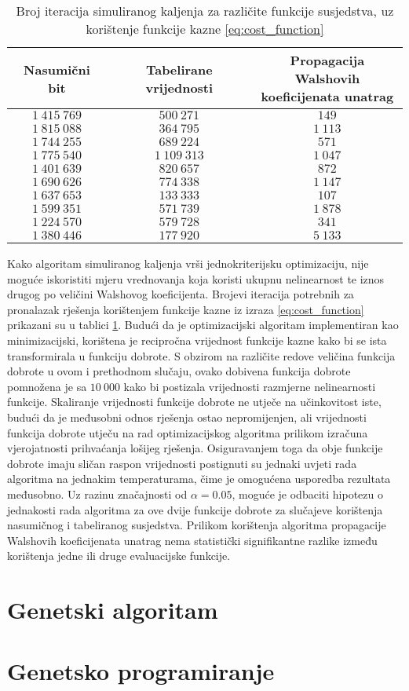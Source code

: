 \begin{table}[]
    \centering
    \begin{tabular}{ccc}
        Nasumični bit & Tabelirane vrijednosti & \makecell{Propagacija Walshovih \\ koeficijenata unatrag} \\ \hline
        $1\:415\:769$ &    $500\:271$ &    $149$ \\
        $1\:815\:088$ &    $364\:795$ & $1\:113$ \\
        $1\:744\:255$ &    $689\:224$ &    $571$ \\
        $1\:775\:540$ & $1\:109\:313$ & $1\:047$ \\
        $1\:401\:639$ &    $820\:657$ &    $872$ \\
        $1\:690\:626$ &    $774\:338$ & $1\:147$ \\
        $1\:637\:653$ &    $133\:333$ &    $107$ \\
        $1\:599\:351$ &    $571\:739$ & $1\:878$ \\
        $1\:224\:570$ &    $579\:728$ &    $341$ \\
        $1\:380\:446$ &    $177\:920$ & $5\:133$
    \end{tabular}
    \captionsetup{justification=centering}
    \caption{Broj iteracija simuliranog kaljenja za različite funkcije susjedstva, uz korištenje funkcije kazne \eqref{eq:cost_function}}
    \label{tbl:simaneal_6_walshe}
\end{table}
Kako algoritam simuliranog kaljenja vrši jednokriterijsku optimizaciju, nije moguće iskoristiti mjeru vrednovanja koja koristi ukupnu nelinearnost te iznos drugog po veličini Walshovog koeficijenta.
Brojevi iteracija potrebnih za pronalazak rješenja korištenjem funkcije kazne iz izraza \eqref{eq:cost_function} prikazani su u tablici \ref{tbl:simaneal_6_walshe}.
Budući da je optimizacijski algoritam implementiran kao minimizacijski, korištena je recipročna vrijednost funkcije kazne kako bi se ista transformirala u funkciju dobrote.
S obzirom na različite redove veličina funkcija dobrote u ovom i prethodnom slučaju, ovako dobivena funkcija dobrote pomnožena je sa $10\:000$ kako bi postizala vrijednosti razmjerne nelinearnosti funkcije.
Skaliranje vrijednosti funkcije dobrote ne utječe na učinkovitost iste, budući da je međusobni odnos rješenja ostao nepromijenjen, ali vrijednosti funkcija dobrote utječu na rad optimizacijskog algoritma prilikom izračuna vjerojatnosti prihvaćanja lošijeg rješenja.
Osiguravanjem toga da obje funkcije dobrote imaju sličan raspon vrijednosti postignuti su jednaki uvjeti rada algoritma na jednakim temperaturama, čime je omogućena usporedba rezultata međusobno.
Uz razinu značajnosti od $\alpha = 0.05$, moguće je odbaciti hipotezu o jednakosti rada algoritma za ove dvije funkcije dobrote za slučajeve korištenja nasumičnog i tabeliranog susjedstva.
Prilikom korištenja algoritma propagacije Walshovih koeficijenata unatrag nema statistički signifikantne razlike između korištenja jedne ili druge evaluacijske funkcije.

\section{Genetski algoritam}
\section{Genetsko programiranje}